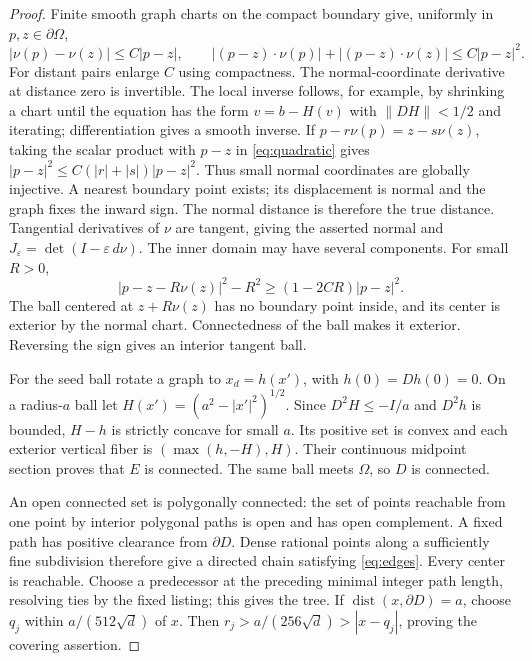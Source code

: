 \documentclass[11pt]{article}
\theoremstyle{remark}
\newcommand{\Om}{\Omega}
\DeclareMathOperator{\dist}{dist}
\begin{document}
\begin{proof}
Finite smooth graph charts on the compact boundary give, uniformly in
$p,z\in\partial\Om$,
\begin{equation}\label{eq:quadratic}
 |\nu(p)-\nu(z)|\leq C|p-z|,\qquad
 |(p-z)\cdot\nu(p)|+|(p-z)\cdot\nu(z)|\leq C|p-z|^2.
\end{equation}
For distant pairs enlarge $C$ using compactness.
The normal-coordinate derivative at distance zero is invertible.
The local inverse follows, for example, by shrinking a chart until the
equation has the form $v=b-H(v)$ with $\|DH\|<1/2$ and iterating;
differentiation gives a smooth inverse.
If $p-r\nu(p)=z-s\nu(z)$, taking the scalar product with $p-z$ in
\eqref{eq:quadratic} gives
$|p-z|^2\leq C(|r|+|s|)|p-z|^2$.
Thus small normal coordinates are globally injective.
A nearest boundary point exists; its displacement is normal and the graph
fixes the inward sign. The normal distance is therefore the true distance.
Tangential derivatives of $\nu$ are tangent, giving the asserted normal
and $J_\varepsilon=\det(I-\varepsilon\,d\nu)$.
The inner domain may have several components.
For small $R>0$,
\[
 |p-z-R\nu(z)|^2-R^2\geq(1-2CR)|p-z|^2.
\]
The ball centered at $z+R\nu(z)$ has no boundary point inside, and its
center is exterior by the normal chart. Connectedness of the ball makes
it exterior. Reversing the sign gives an interior tangent ball.

For the seed ball rotate a graph to $x_d=h(x')$, with
$h(0)=Dh(0)=0$. On a radius-$a$ ball let
$H(x')=(a^2-|x'|^2)^{1/2}$. Since $D^2H\leq-I/a$ and $D^2h$ is bounded,
$H-h$ is strictly concave for small $a$.
Its positive set is convex and each exterior vertical fiber is
$(\max(h,-H),H)$. Their continuous midpoint section proves that $E$
is connected. The same ball meets $\Om$, so $D$ is connected.

An open connected set is polygonally connected: the set of points reachable
from one point by interior polygonal paths is open and has open complement.
A fixed path has positive clearance from $\partial D$.
Dense rational points along a sufficiently fine subdivision therefore
give a directed chain satisfying \eqref{eq:edges}.
Every center is reachable. Choose a predecessor at the preceding minimal
integer path length, resolving ties by the fixed listing; this gives the tree.
If $\dist(x,\partial D)=a$, choose $q_j$ within $a/(512\sqrt d)$ of $x$.
Then $r_j>a/(256\sqrt d)>|x-q_j|$, proving the covering assertion.
\end{proof}
\end{document}
